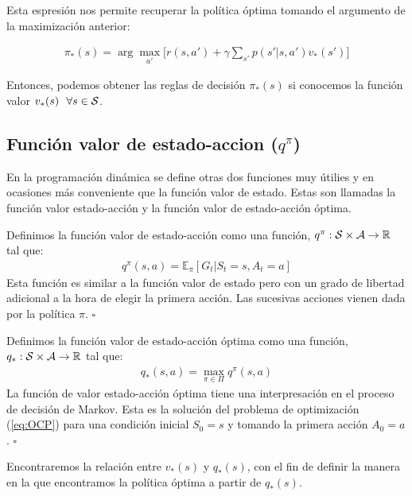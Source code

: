 Esta espresión nos permite recuperar la política óptima tomando el argumento de la maximización anterior:

\begin{gather}
    \pi_*(s) = \arg \max_{a'} \bigg[ r(s,a') + \gamma \sum_{s'}p(s'|s,a') v_*(s')
        \bigg]
\end{gather}

Entonces, podemos obtener las reglas de decisión $\pi_*(s)$ si conocemos la función valor $v_*(s) \ \ \forall s \in \Ss$.\newline

\subsection{Función valor de estado-accion ($q^\pi$)}

En la programación dinámica se define otras dos funciones muy útilies y en ocasiones más conveniente que la función valor de estado. Estas son llamadas la función valor estado-acción y la función valor de estado-acción óptima.

\begin{defi}
    Definimos la función valor de estado-acción como una función, $q^\pi: \mathcal{S} \times \mathcal{A} \rightarrow \mathbb{R}$ tal que:
    \begin{gather}
        q^\pi(s,a) = \mathbb{E}_\pi[G_t|S_t = s,A_t=a]
    \end{gather}
    Esta función es similar a la función valor de estado pero con un grado de libertad adicional a la hora de elegir la primera acción. Las sucesivas acciones vienen dada por la política $\pi$.
    \hfill\ensuremath{\square}
\end{defi}


\begin{defi}
    Definimos la función valor de estado-acción óptima como una función, $q_*: \mathcal{S} \times \mathcal{A} \rightarrow \mathbb{R}$ tal que:
    \begin{gather}\label{qopt}
        q_*(s,a) = \max_{\pi \in \Pi} q^\pi(s,a)
    \end{gather}
    La función de valor estado-acción óptima tiene una interpresación en el proceso de decisión de Markov. Esta es la solución del problema de optimización (\ref{eq:OCP}) para una condición inicial $S_0=s$ y tomando la primera acción  $A_0=a$.
    \hfill\ensuremath{\square}
\end{defi}


Encontraremos la relación entre $v_*(s)$ y $q_*(s)$, con el fin de definir la manera en la que encontramos la política óptima a partir de $q_*(s)$. \newline


